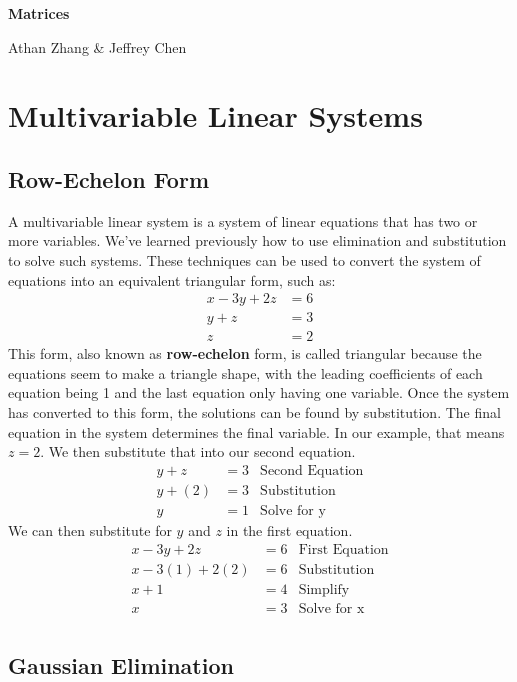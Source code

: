 \documentclass[11pt]{article}
\begin{document}
\textbf{\Huge Matrices}

Athan Zhang \& Jeffrey Chen

\section{Multivariable Linear Systems}

\subsection{Row-Echelon Form}

A multivariable linear system is a system of linear equations that has two or more variables. We've learned previously how to use elimination and substitution to solve such systems. These techniques can be used to convert the system of equations into an equivalent triangular form, such as:
\begin{align*}
    x - 3y + 2z &= 6 \\
    y + z &= 3 \\
    z &= 2 
\end{align*}
This form, also known as \textbf{row-echelon} form, is called triangular because the equations seem to make a triangle shape, with the leading coefficients of each equation being 1 and the last equation only having one variable. Once the system has converted to this form, the solutions can be found by substitution. The final equation in the system determines the final variable. In our example, that means $z = 2$. We then substitute that into our second equation.
\begin{align*}
    y + z &= 3 & \text{Second Equation} \\
    y + (2) &= 3 & \text{Substitution} \\
    y &= 1 & \text{Solve for y}
\end{align*}
We can then substitute for $y$ and $z$ in the first equation.
\begin{align*}
    x - 3y + 2z &= 6 & \text{First Equation} \\
    x - 3(1) + 2(2) &= 6 & \text{Substitution} \\
    x + 1 &= 4 & \text{Simplify} \\
    x &= 3 & \text{Solve for x} \\
\end{align*}

\subsection{Gaussian Elimination}
\end{document}
